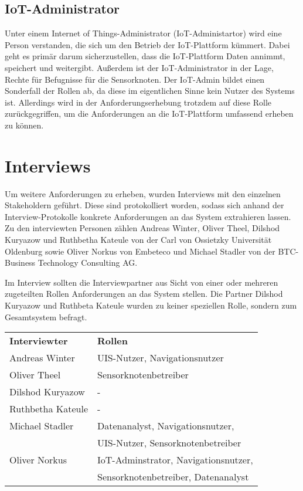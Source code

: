 \subsection{IoT-Administrator} \label{iotAdmin}
Unter einem Internet of Things-Administrator (IoT-Administartor) wird eine Person verstanden, die sich um den Betrieb der IoT-Plattform kümmert. Dabei geht es primär darum sicherzustellen, dass die IoT-Plattform Daten annimmt, speichert und weitergibt. Außerdem ist der IoT-Administrator in der Lage, Rechte für Befugnisse für die Sensorknoten. Der IoT-Admin bildet einen Sonderfall der Rollen ab, da diese im eigentlichen Sinne kein Nutzer des Systems ist. Allerdings wird in der Anforderungserhebung trotzdem auf diese Rolle zurückgegriffen, um die Anforderungen an die IoT-Plattform umfassend erheben zu können.

\section{Interviews}\label{ADInterviews}
Um weitere Anforderungen zu erheben, wurden Interviews mit den einzelnen Stakeholdern geführt. Diese sind protokolliert worden, sodass sich anhand der Interview-Protokolle konkrete Anforderungen an das System extrahieren lassen. Zu den interviewten Personen zählen Andreas Winter, Oliver Theel, Dilshod Kuryazow und Ruthbetha Kateule von der Carl von Ossietzky Universität Oldenburg sowie Oliver Norkus von Embeteco und Michael Stadler von der BTC-Business Technology Consulting AG.

Im Interview sollten die Interviewpartner aus Sicht von einer oder mehreren zugeteilten Rollen Anforderungen an das System stellen. Die Partner Dilshod Kuryazow und Ruthbeta Kateule wurden zu keiner speziellen Rolle, sondern zum Gesamtsystem befragt.\\

\begin{tabular}{ll}
\textbf{Interviewter} & \textbf{Rollen}\\
Andreas Winter & UIS-Nutzer, Navigationsnutzer \\
Oliver Theel & Sensorknotenbetreiber\\
Dilshod Kuryazow & -\\
Ruthbetha Kateule & -\\
Michael Stadler & Datenanalyst, Navigationsnutzer, \\ 
& UIS-Nutzer, Sensorknotenbetreiber\\
Oliver Norkus & IoT-Adminstrator, Navigationsnutzer, \\ 
& Sensorknotenbetreiber, Datenanalyst\\
\end{tabular}
\\

